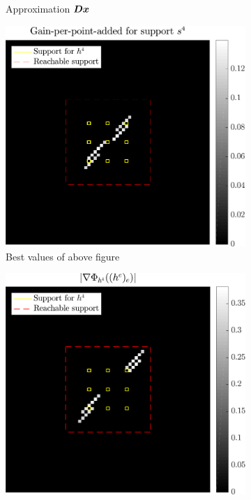 \begin{figure}[!ht]
\begin{subfigure}[b]{0.30\linewidth}
	\caption{Approximation $\bm{D}\bm{x}$}\label{fig_gain_n4-approx}
	\end{subfigure}
	\begin{subfigure}[b]{0.34\linewidth}\centering
	\includegraphics[width=\linewidth]{figures/xp/n4/xp_128x128_sc2_angl1_K3_S3_node4_objmatrix_bestvalues.pdf}
	\caption{Best values of above figure}\label{fig_gain_n4-gain_best}
	\end{subfigure}
	\begin{subfigure}[b]{0.34\linewidth}\centering
	\includegraphics[width=\linewidth]{figures/xp/n4/xp_128x128_sc2_angl1_K3_S3_node4_partgrad4_bestvalues.pdf}

\end{subfigure}
\end{figure}
